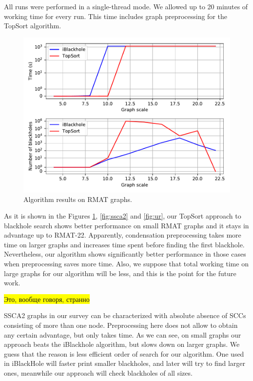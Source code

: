 \documentclass{svproc}
\newcommand{\FIXME}[1]{ %
	\colorbox{yellow}{#1}
}
\newcommand{\FIXME}[1]{ %
}
\begin{document}
All runs were performed in a single-thread mode. We allowed up to 20 minutes of working time for every run. This time includes graph preprocessing for the TopSort algorithm.

\begin{figure}[H]
	\includegraphics[width=\linewidth]{rmat.pdf}
	\caption{Algorithm results on RMAT graphs.}
	\label{fig:rmat}
\end{figure}

As it is shown in the Figures \ref{fig:rmat}, \ref{fig:ssca2} and \ref{fig:ur}, our TopSort approach to blackhole search shows better performance on small RMAT graphs and it stays in advantage up to RMAT-22. Apparently, condensation preprocessing takes more time on larger graphs and increases time spent before finding
the first blackhole. Nevertheless, our algorithm shows significantly better performance in those cases when preprocessing saves more time. Also, we suppose
that total working time on large graphs for our algorithm will be less, and this is the point for the future work.

\FIXME{Это, вообще говоря, странно}
SSCA2 graphs in our survey can be characterized with absolute absence of SCCs consisting of more than one node. Preprocessing here does not allow to obtain any
certain advantage, but only takes time. As we can see, on small graphs our approach beats the iBlackhole algorithm, but slows down on larger graphs.
We guess that the reason is less efficient order of search for our algorithm. One used in iBlackHole will faster print smaller blackholes, and later will try
to find larger ones, meanwhile our approach will check blackholes of all sizes.
\end{document}
